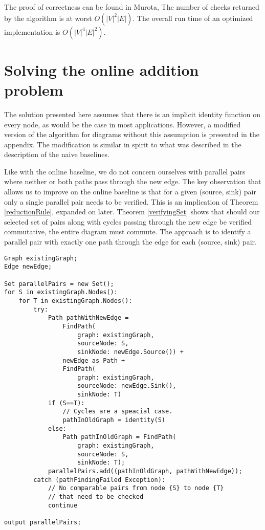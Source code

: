 \documentclass[sigplan,review,anonymous]{acmart}
\begin{document}
The proof of correctness can be found in Murota\cite{commutative}, 
The number of checks returned by the algorithm is at worst $O(|V|^2|E|)$. The overall run time of an optimized implementation is $O(|V|^4|E|^2)$.

\section{Solving the online addition problem}

The solution presented here assumes that there is an implicit identity function on every node, as would be the case in most applications. However, a modified version of the algorithm for diagrams without this assumption is presented in the appendix. The modification is similar in spirit to what was described in the description of the naive baselines.

Like with the online baseline, we do not concern ourselves with parallel pairs where neither or both paths pass through the new edge.
The key observation that allows us to improve on the online baseline is that for a given (source, sink) pair only a single parallel pair needs to be verified. This is an implication of Theorem \ref{reductionRule}, expanded on later.
Theorem \ref{verifyingSet} shows that should our selected set of pairs along with cycles passing through the new edge be verified commutative, the entire diagram must commute. The approach is to identify a parallel pair with exactly one path through the edge for each (source, sink) pair.


\begin{verbatim}
Graph existingGraph;
Edge newEdge;

Set parallelPairs = new Set();
for S in existingGraph.Nodes():
    for T in existingGraph.Nodes():
        try:
            Path pathWithNewEdge = 
                FindPath(
                    graph: existingGraph, 
                    sourceNode: S,
                    sinkNode: newEdge.Source()) +
                newEdge as Path +
                FindPath(
                    graph: existingGraph, 
                    sourceNode: newEdge.Sink(), 
                    sinkNode: T)
            if (S==T):
                // Cycles are a speacial case.
                pathInOldGraph = identity(S)
            else:
                Path pathInOldGraph = FindPath(
                    graph: existingGraph, 
                    sourceNode: S, 
                    sinkNode: T);
            parallelPairs.add((pathInOldGraph, pathWithNewEdge));
        catch (pathFindingFailed Exception):
            // No comparable pairs from node {S} to node {T} 
            // that need to be checked
            continue

output parallelPairs;
\end{verbatim}
\end{document}
